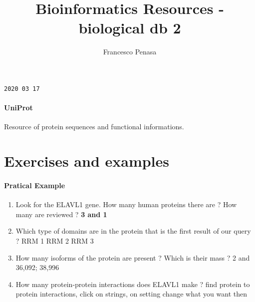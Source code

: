 \documentclass[11pt]{article}
\begin{document}
\author{Francesco Penasa}
\title{Bioinformatics Resources - biological db 2}
\maketitle

\medskip

\texttt{2020 03 17}
\paragraph{UniProt} %
\label{par:uniprot}
Resource of protein sequences and functional informations. 

\section{Exercises and examples} %
\label{sec:exercises_and_examples}
\paragraph{Pratical Example } %
\label{par:pratical_example_}
\begin{enumerate}
	\item Look for the ELAVL1 gene. How many human proteins there are ? How many are reviewed ?  \textbf{3 and 1}
	\item Which type of domains are in the protein that is the first result of our query ? RRM 1 RRM 2 RRM 3
	\item How many isoforms of the protein are present ? Which is their mass ? 2 and 36,092; 38,996
	\item How many protein-protein interactions does ELAVL1 make ? find protein to protein interactions, click on strings, on setting change what you want then
\end{enumerate}
\end{document}
